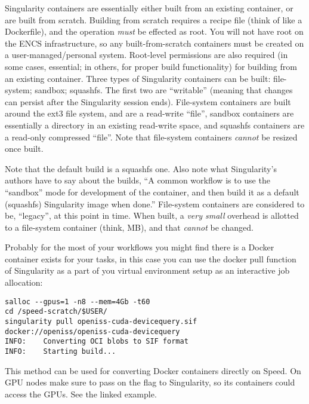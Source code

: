 Singularity containers are essentially either built from an existing 
container, or are built from scratch. Building from scratch requires a recipe 
file (think of like a Dockerfile), and the operation \emph{must} be effected as root.
You will not have root on the ENCS infrastructure, so any built-from-scratch containers must be created 
on a user-managed/personal system. Root-level permissions are also required
(in some cases, essential; in others, for proper build functionality) for 
building from an existing container.
%
Three types of Singularity containers can be built: file-system; sandbox; 
squashfs. The first two are ``writable'' (meaning that changes can persist 
after the Singularity session ends). File-system containers are built around 
the ext3 file system, and are a read-write ``file'', sandbox containers are 
essentially a directory in an existing read-write space, and squashfs 
containers are a read-only compressed ``file''. Note that file-system 
containers \emph{cannot} be resized once built.

Note that the default build is a squashfs one. Also note what Singularity's 
authors have to say about the builds, ``A common workflow is to use the 
``sandbox'' mode for development of the container, and then build it as a 
default (squashfs) Singularity image when done.'' File-system containers are 
considered to be, ``legacy'', at this point in time. When built, a \emph{very small}
overhead is allotted to a file-system container (think, MB), and that 
\emph{cannot} be changed.

Probably for the most of your workflows you might find there is a
Docker container exists for your tasks, in this case you
can use the docker pull function of Singularity as a part
of you virtual environment setup as an interactive job
allocation:

\small
\begin{verbatim}
salloc --gpus=1 -n8 --mem=4Gb -t60
cd /speed-scratch/$USER/
singularity pull openiss-cuda-devicequery.sif docker://openiss/openiss-cuda-devicequery
INFO:    Converting OCI blobs to SIF format
INFO:    Starting build...
\end{verbatim}
\normalsize

\noindent
This method can be used for converting Docker containers directly on Speed.
On GPU nodes make sure to pass on the  flag to Singularity,
so its containers could access the GPUs. See the linked example.
